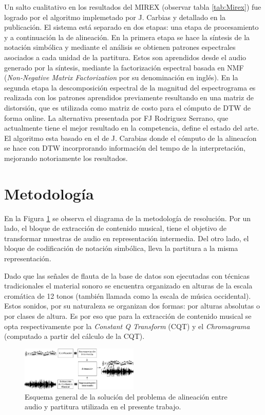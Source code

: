 \documentclass
  [ams,pdfout]%
	{aeslac}
\begin{document}
Un salto cualitativo en los resultados del MIREX (observar tabla \ref{tab:Mirex}) fue logrado por el algoritmo implemetado por J. Carbias y detallado en la publicación\cite{carabias2015audio}. El sistema está separado en dos etapas: una etapa de procesamiento y a continuación la de alineación. En la primera etapa se hace la síntesis de la notación simbólica y mediante el análisis se obtienen patrones espectrales asociados a cada unidad de la partitura. Estos son aprendidos desde el audio generado por la síntesis, mediante la factorización espectral basada en NMF (\textit{Non-Negative Matrix Factorization} por su denominación en inglés). En la segunda etapa la descomposición espectral de la magnitud del espectrograma es realizada con los patrones aprendidos previamente resultando en una matriz de distorsión, que es utilizada como matriz de costo para el cómputo de DTW de forma online. La alternativa presentada por FJ Rodriguez Serrano\cite{rodriguez2017tempo}, que actualmente tiene el mejor resultado en la competencia, define el estado del arte. El algoritmo esta basado en el de J. Carabias donde el cómputo de la alineacíon se hace con DTW incorprorando información del tempo de la interpretación, mejorando notoriamente los resultados.


\section{Metodología}

En la Figura \ref{fig:diagrama_general} se observa el diagrama de la metodología de resolución. Por un lado, el bloque de extracción de contenido musical, tiene el objetivo de transformar muestras de audio en representación intermedia. Del otro lado, el bloque de codificación de notación simbólica, lleva la partitura a la misma representación. 

Dado que las señales de flauta de la base de datos son ejecutadas con técnicas tradicionales el material sonoro se encuentra organizado en alturas de la escala cromática de 12 tonos (también llamada como la escala de música occidental). Estos sonidos, por su naturaleza se organizan dos formas: por alturas absolutas o por clases de altura. Es por eso que para la extracción de contenido musical se opta respectivamente por la \textit{Constant Q Transform}\cite{schorkhuber2010constant} (CQT) y el \textit{Chromagrama} (computado a partir del cálculo de la CQT).

\begin{figure}[h!]
\begin{center}
\includegraphics[width=0.5\textwidth]{imagenes/diagrama_general-back} 	
\caption{Esquema general de la solución del problema de alineación entre audio y partitura utilizada en el presente trabajo.}
\label{fig:diagrama_general}
\end{center}
\end{figure}
\end{document}
